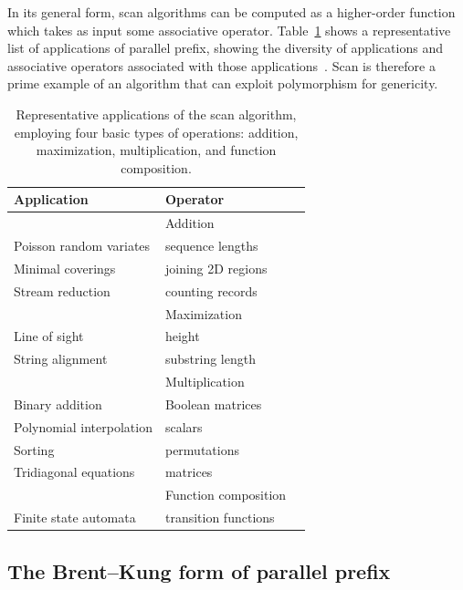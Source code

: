 \documentclass{sig-alternate}
\begin{document}
In its general form, scan algorithms can be computed as a higher-order function
which takes as input some associative operator. Table~\ref{tab:prefixapps}
shows a representative list of applications of parallel prefix, showing the
diversity of applications and associative operators associated with those
applications~\cite{Blelloch1990,Blelloch1993}. Scan is therefore a prime
example of an algorithm that can exploit polymorphism for genericity.

\begin{table}
	\begin{tabular}{l l l}
		\hline
		Application              & Operator                  \\ \hline
		                         & Addition\\
		Poisson random variates \cite{Lu1996} & sequence lengths \\
		Minimal coverings \cite{Moitra1991}   & joining 2D regions \\
		Stream reduction \cite{Horn2005}      & counting records \\ \hline
	                                 & Maximization\\
		Line of sight \cite{Blelloch1990}          & height\\
		String alignment \cite{Hillis1986,Chi1992} & substring length\\ \hline
					 & Multiplication\\
		Binary addition \cite{Sklansky1960} 	      & Boolean matrices\\
		Polynomial interpolation \cite{Egecioglu1990} & scalars\\
		Sorting	\cite{Hillis1986,Blelloch1989} 		 & permutations\\ \hline
		Tridiagonal equations  \cite{Mathias1995}     & matrices\\
					 & Function composition & \\
		Finite state automata \cite{Ladner1980,Hillis1986}  & transition functions\\ \hline
	\end{tabular}
	\caption{Representative applications of the scan algorithm, employing
	four basic types of operations: addition, maximization, multiplication,
	and function composition.}
	\label{tab:prefixapps}
\end{table}

\subsection{The Brent--Kung form of parallel prefix}
\end{document}

